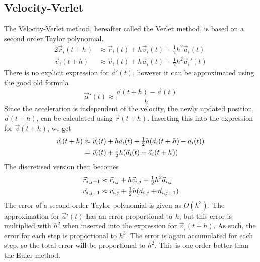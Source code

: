 \documentclass[12pt,english,a4paper]{article}
\begin{document}
\subsection{Velocity-Verlet}\label{verlet}
The Velocity-Verlet method, hereafter called the Verlet method, is based on a second order Taylor polynomial.
\begin{alignat*}{2}
\vec{r}_i(t+h) &\approx \vec{r}_i(t) + h\vec{v}_i(t) + \tfrac{1}{2}h^2\vec{a}_i(t)\\
\vec{v}_i(t+h) &\approx \vec{v}_i(t) + h\vec{a}_i(t) + \tfrac{1}{2}h^2\vec{a}_i'(t)
\end{alignat*}
There is no explicit expression for \(\vec{a}'(t)\), however it can be approximated using the good old formula
\[
\vec{a}'(t)\approx\frac{\vec{a}(t+h)-\vec{a}(t)}{h}
\]
Since the acceleration is independent of the velocity, the newly updated position, \(\vec{a}(t+h)\), can be calculated using \(\vec{r}(t+h)\). Inserting this into the expression for \(\vec{v}(t+h)\), we get
\begin{alignat*}{2}
\vec{v}_i(t+h) &\approx \vec{v}_i(t) + h\vec{a}_i(t) + \tfrac{1}{2}h\qty(\vec{a}_i(t+h)-\vec{a}_i(t))\\
&= \vec{v}_i(t) + \tfrac{1}{2}h\qty(\vec{a}_i(t)+\vec{a}_i(t+h))
\end{alignat*}
The discretised version then becomes
\begin{alignat*}{2}
\vec{r}_{i,j+1} &\approx \vec{r}_{i,j} + h\vec{v}_{i,j} + \tfrac{1}{2}h^2\vec{a}_{i,j}\\
\vec{v}_{i,j+1} &\approx \vec{v}_{i,j} + \tfrac{1}{2}h\qty(\vec{a}_{i,j} + \vec{a}_{i,j+1})
\end{alignat*}
The error of a second order Taylor polynomial is given as \(O(h^3)\). The approximation for \(\vec{a}'(t)\) has an error proportional to \(h\), but this error is multiplied with \(h^2\) when inserted into the expression for \(\vec{v}_i(t+h)\). As such, the error for each step is proportional to \(h^3\)\autocite{compphys}. The error is again accumulated for each step, so the total error will be proportional to \(h^2\). This is one order better than the Euler method.


\end{document}
